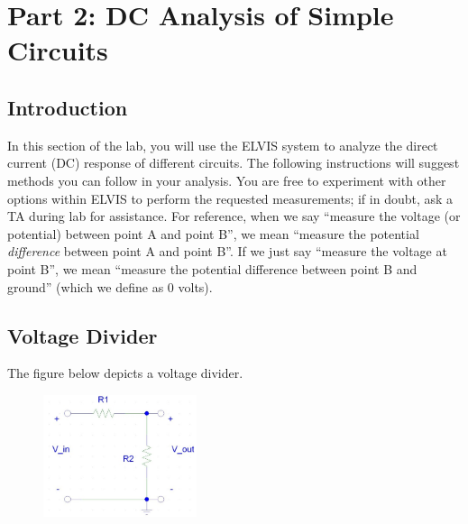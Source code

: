 \documentclass{article}
\begin{document}
\section*{Part 2: DC Analysis of Simple Circuits}
\subsection*{Introduction}
In this section of the lab, you will use the ELVIS system to analyze the direct current (DC) response of different circuits. The following instructions will suggest methods you can follow in your analysis. You are free to experiment with other options within ELVIS to perform the requested measurements; if in doubt, ask a TA during lab for assistance. For reference, when we say “measure the voltage (or potential) between point A and point B”, we mean “measure the potential \textit{difference} between point A and point B”. If we just say “measure the voltage at point B”, we mean “measure the potential difference between point B and ground” (which we define as 0 volts).

\subsection*{Voltage Divider}
The figure below depicts a voltage divider.
\begin{figure}[h!]
    	\includegraphics[width=0.4\textwidth]{lab_1_fig_3.jpg}
    	\centering
		\end{figure}
\end{document}
